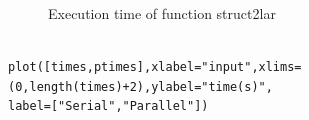 \documentclass[a4paper,12pt]{article}
\begin{document}
\begin{figure}[!h]
\centering
{}
\caption{Execution time of function struct2lar}
\end{figure}
\newpage

\noindent{}
\begin{Verbatim}[fontsize=\footnotesize]

plot([times,ptimes],xlabel="input",xlims=(0,length(times)+2),ylabel="time(s)",
label=["Serial","Parallel"])

\end{Verbatim}
\vspace{20px}
\end{document}
